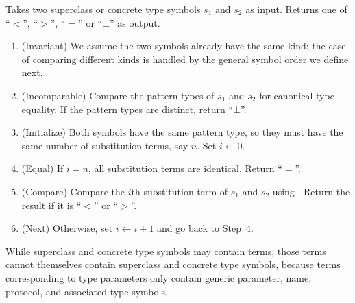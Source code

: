 \documentclass[../generics]{subfiles}
\begin{document}
\begin{algorithm}\label{concrete reduction order}
Takes two superclass or concrete type symbols $s_1$ and $s_2$ as input. Returns one of ``$<$'', ``$>$'', ``$=$'' or \index{$\bot$}``$\bot$'' as output.
\begin{enumerate}
\item (Invariant) We assume the two symbols already have the same kind; the case of comparing different kinds is handled by the general symbol order we define next.
\item (Incomparable) Compare the pattern types of $s_1$ and $s_2$ for canonical type equality. If the pattern types are distinct, return ``$\bot$''.
\item (Initialize) Both symbols have the same pattern type, so they must have the same number of substitution terms, say $n$. Set $i\leftarrow 0$.
\item (Equal) If $i=n$, all substitution terms are identical. Return ``$=$''.
\item (Compare) Compare the $i$th substitution term of $s_1$ and $s_2$ using . Return the result if it is ``$<$'' or ``$>$''.
\item (Next) Otherwise, set $i\leftarrow i+1$ and go back to Step~4.
\end{enumerate}
\end{algorithm}

While superclass and concrete type symbols may contain terms, those terms cannot themselves contain superclass and concrete type symbols, because terms corresponding to type parameters only contain generic parameter, name, protocol, and associated type symbols.
\end{document}
